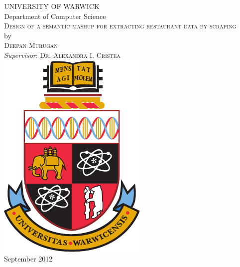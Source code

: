\documentclass[12pt,a4paper]{report}
\begin{document}

\begin{titlepage}
  \begin{center}
    \textsc{\LARGE UNIVERSITY OF WARWICK}\\
    \large Department of Computer Science\\[1.5cm]
    
    \textsc{\LARGE Design of a semantic mashup for extracting restaurant data by scraping}\\[1.5cm]
    by\\[0.4cm]
    \textsc{\Large Deepan Murugan}\\[1cm]
    \large{\emph{Supervisor}: \textsc{\Large Dr. Alexandra I. Cristea}}\\[1.5cm]
    \includegraphics{fig/crest_fullcolour.pdf}\\[1.5cm]
    \LARGE September 2012
    
  \end{center}
\end{titlepage}

\cleardoublepage
{}
{}
\renewcommand{\contentsname}{Table of Contents}

\tableofcontents

\setcounter{secnumdepth}{-3}

\cleardoublepage
{}
{}
\listoffigures




\setcounter{secnumdepth}{2}









\cleardoublepage
{}
{}


\end{document}

